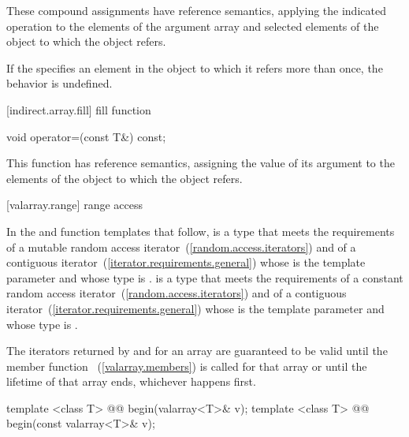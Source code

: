 \begin{itemdescr}
\pnum
These compound assignments have reference semantics, applying the indicated
operation to the elements of the argument array and selected elements of the
object to which the
object refers.

\pnum
If the
specifies an element in the
object to which it refers more than once,
the behavior is undefined.
\end{itemdescr}

[indirect.array.fill]{ fill function}

%
\begin{itemdecl}
void operator=(const T&) const;
\end{itemdecl}

\begin{itemdescr}
\pnum
This function has reference semantics, assigning the value of its argument
to the elements of the
object to which the
object refers.
\end{itemdescr}

[valarray.range]{ range access}

\pnum
In the  and  function templates that follow, 
is a type that meets the requirements of a mutable random access
iterator~(\ref{random.access.iterators})
and of a contiguous iterator~(\ref{iterator.requirements.general})
whose  is the template
parameter  and whose  type is .  is a
type that meets the requirements of a constant random access
iterator~(\ref{random.access.iterators})
and of a contiguous iterator~(\ref{iterator.requirements.general})
whose  is the template
parameter  and whose  type is .

\pnum
The iterators returned by  and  for an array
are guaranteed to be valid until the member function
~(\ref{valarray.members}) is called for that
array or until the lifetime of that array ends, whichever happens
first.

%
\begin{itemdecl}
template <class T> @@ begin(valarray<T>& v);
template <class T> @@ begin(const valarray<T>& v);
\end{itemdecl}

